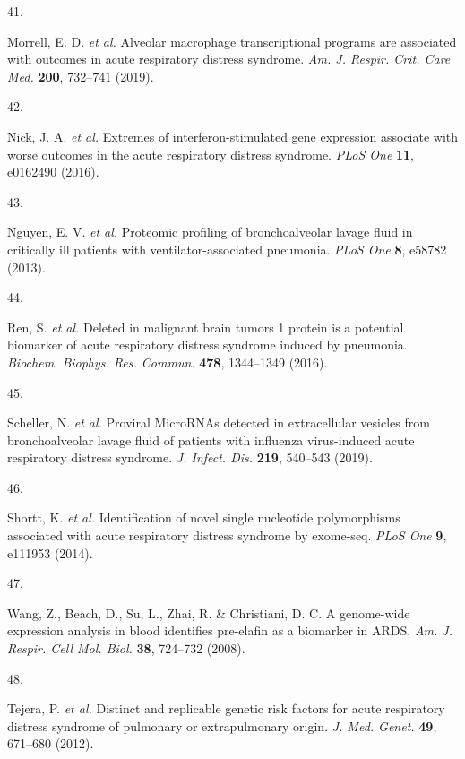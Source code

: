 \documentclass[
  11,
  a4paper,
]{article}
\newlength{\cslhangindent}
\newlength{\csllabelwidth}
\newlength{\cslentryspacingunit} %
\newenvironment{CSLReferences}[2] %
 {%
  \setlength{\parindent}{0pt}
  \ifodd #1
  \let\oldpar\par
  \def\par{\hangindent=\cslhangindent\oldpar}
  \fi
  \setlength{\parskip}{#2\cslentryspacingunit}
 }%
 {}
\newcommand{\CSLLeftMargin}[1]{\parbox[t]{\csllabelwidth}{#1}}
\newcommand{\CSLRightInline}[1]{\parbox[t]{\linewidth - \csllabelwidth}{#1}\break}
\begin{document}
\begin{CSLReferences}{0}{0}
\leavevmode{}%
\CSLLeftMargin{41. }%
\CSLRightInline{Morrell, E. D. \emph{et al.} Alveolar macrophage
transcriptional programs are associated with outcomes in acute
respiratory distress syndrome. \emph{Am. J. Respir. Crit. Care Med.}
\textbf{200}, 732--741 (2019).}

\leavevmode{}%
\CSLLeftMargin{42. }%
\CSLRightInline{Nick, J. A. \emph{et al.} Extremes of
interferon-stimulated gene expression associate with worse outcomes in
the acute respiratory distress syndrome. \emph{PLoS One} \textbf{11},
e0162490 (2016).}

\leavevmode{}%
\CSLLeftMargin{43. }%
\CSLRightInline{Nguyen, E. V. \emph{et al.} Proteomic profiling of
bronchoalveolar lavage fluid in critically ill patients with
ventilator-associated pneumonia. \emph{PLoS One} \textbf{8}, e58782
(2013).}

\leavevmode{}%
\CSLLeftMargin{44. }%
\CSLRightInline{Ren, S. \emph{et al.} Deleted in malignant brain tumors
1 protein is a potential biomarker of acute respiratory distress
syndrome induced by pneumonia. \emph{Biochem. Biophys. Res. Commun.}
\textbf{478}, 1344--1349 (2016).}

\leavevmode{}%
\CSLLeftMargin{45. }%
\CSLRightInline{Scheller, N. \emph{et al.} Proviral {MicroRNAs} detected
in extracellular vesicles from bronchoalveolar lavage fluid of patients
with influenza virus-induced acute respiratory distress syndrome.
\emph{J. Infect. Dis.} \textbf{219}, 540--543 (2019).}

\leavevmode{}%
\CSLLeftMargin{46. }%
\CSLRightInline{Shortt, K. \emph{et al.} Identification of novel single
nucleotide polymorphisms associated with acute respiratory distress
syndrome by exome-seq. \emph{PLoS One} \textbf{9}, e111953 (2014).}

\leavevmode{}%
\CSLLeftMargin{47. }%
\CSLRightInline{Wang, Z., Beach, D., Su, L., Zhai, R. \& Christiani, D.
C. A genome-wide expression analysis in blood identifies pre-elafin as a
biomarker in {ARDS}. \emph{Am. J. Respir. Cell Mol. Biol.} \textbf{38},
724--732 (2008).}

\leavevmode{}%
\CSLLeftMargin{48. }%
\CSLRightInline{Tejera, P. \emph{et al.} Distinct and replicable genetic
risk factors for acute respiratory distress syndrome of pulmonary or
extrapulmonary origin. \emph{J. Med. Genet.} \textbf{49}, 671--680
(2012).}


\end{CSLReferences}
\end{document}
